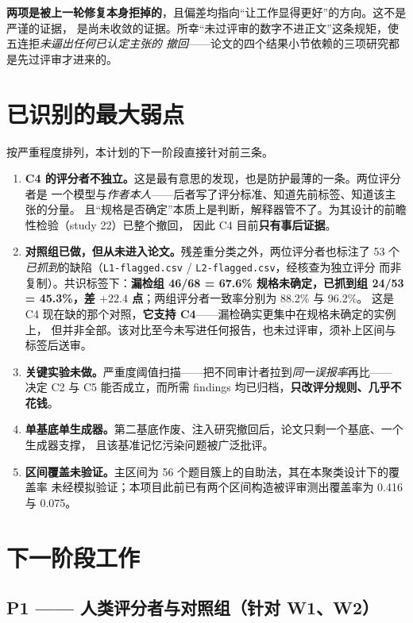\documentclass[11pt,a4paper]{article}
\begin{document}
\textbf{两项是被上一轮修复本身拒掉的}，且偏差均指向“让工作显得更好”的方向。这不是严谨的证据，
是尚未收敛的证据。所幸“未过评审的数字不进正文”这条规矩，使五连拒\emph{未逼出任何已认定主张的
撤回}——论文的四个结果小节依赖的三项研究都是先过评审才进来的。

\section{已识别的最大弱点}

按严重程度排列，本计划的下一阶段直接针对前三条。

\begin{enumerate}[label=\textbf{W\arabic*.}]
\item \textbf{C4 的评分者不独立。}这是最有意思的发现，也是防护最薄的一条。两位评分者是
      一个模型与\emph{作者本人}——后者写了评分标准、知道先前标签、知道该主张的分量。
      且“规格是否确定”本质上是判断，解释器管不了。为其设计的前瞻性检验（study 22）已整个撤回，
      因此 C4 目前\textbf{只有事后证据}。
\item \textbf{对照组已做，但从未进入论文。}残差重分类之外，两位评分者也标注了 53 个
      \emph{已抓到}的缺陷（\texttt{L1-flagged.csv} / \texttt{L2-flagged.csv}，经核查为独立评分
      而非复制）。共识标签下：\textbf{漏检组 46/68 = 67.6\% 规格未确定，已抓到组
      24/53 = 45.3\%，差 $+22.4$ 点}；两组评分者一致率分别为 88.2\% 与 96.2\%。
      这是 C4 现在缺的那个对照，\textbf{它支持 C4}——漏检确实更集中在规格未确定的实例上，
      但并非全部。该对比至今未写进任何报告，也未过评审，须补上区间与标签后送审。
\item \textbf{关键实验未做。}严重度阈值扫描——把不同审计者拉到\emph{同一误报率}再比——
      决定 C2 与 C5 能否成立，而所需 findings 均已归档，\textbf{只改评分规则、几乎不花钱}。
\item \textbf{单基底单生成器。}第二基底作废、注入研究撤回后，论文只剩一个基底、一个生成器支撑，
      且该基准记忆污染问题被广泛批评。
\item \textbf{区间覆盖未验证。}主区间为 56 个题目簇上的自助法，其在本聚类设计下的覆盖率
      未经模拟验证；本项目此前已有两个区间构造被评审测出覆盖率为 0.416 与 0.075。
\end{enumerate}

\section{下一阶段工作}

\subsection{P1 —— 人类评分者与对照组（针对 W1、W2）}
\end{document}
